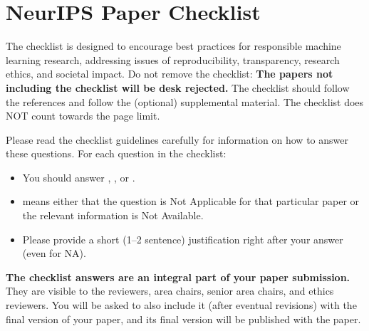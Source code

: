 \documentclass{article}
\begin{document}



\newpage
\section*{NeurIPS Paper Checklist}

The checklist is designed to encourage best practices for responsible machine learning research, addressing issues of reproducibility, transparency, research ethics, and societal impact. Do not remove the checklist: {\bf The papers not including the checklist will be desk rejected.} The checklist should follow the references and follow the (optional) supplemental material.  The checklist does NOT count towards the page
limit. 

Please read the checklist guidelines carefully for information on how to answer these questions. For each question in the checklist:
\begin{itemize}
    \item You should answer \answerYes{}, \answerNo{}, or \answerNA{}.
    \item \answerNA{} means either that the question is Not Applicable for that particular paper or the relevant information is Not Available.
    \item Please provide a short (1–2 sentence) justification right after your answer (even for NA). 
\end{itemize}

{\bf The checklist answers are an integral part of your paper submission.} They are visible to the reviewers, area chairs, senior area chairs, and ethics reviewers. You will be asked to also include it (after eventual revisions) with the final version of your paper, and its final version will be published with the paper.
\end{document}
